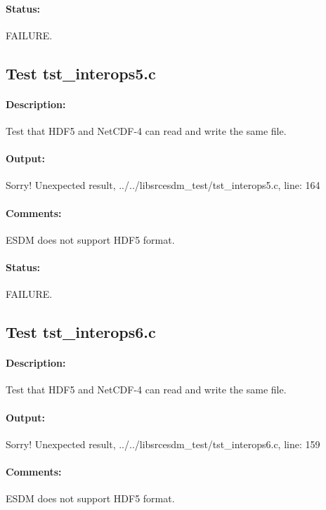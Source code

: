 \paragraph{Status:} FAILURE.

\subsection{Test tst\_interops5.c}

\paragraph{Description:} Test that HDF5 and NetCDF-4 can read and write the same file.

\paragraph{Output:} Sorry! Unexpected result, ../../libsrcesdm\_test/tst\_interops5.c, line: 164

\paragraph{Comments:} ESDM does not support HDF5 format.

\paragraph{Status:} FAILURE.

\subsection{Test tst\_interops6.c}

\paragraph{Description:} Test that HDF5 and NetCDF-4 can read and write the same file.

\paragraph{Output:} Sorry! Unexpected result, ../../libsrcesdm\_test/tst\_interops6.c, line: 159

\paragraph{Comments:} ESDM does not support HDF5 format.

